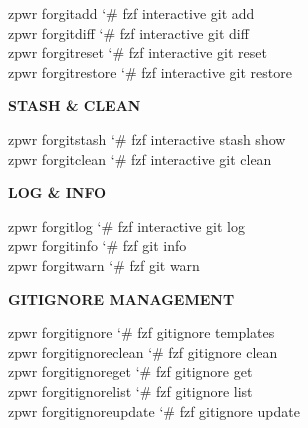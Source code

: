 \documentclass[11pt,a4paper,twoside]{book}
\begin{document}
\begin{codebox}
\color{neongreen}zpwr forgitadd             {\char`\#} fzf interactive git add\\
\color{neongreen}zpwr forgitdiff            {\char`\#} fzf interactive git diff\\
\color{neongreen}zpwr forgitreset           {\char`\#} fzf interactive git reset\\
\color{neongreen}zpwr forgitrestore         {\char`\#} fzf interactive git restore\\
\end{codebox}


\vspace{12pt}
{\bfseries\color{neonyellow} STASH \& CLEAN}\vspace{4pt}

\begin{codebox}
\color{neongreen}zpwr forgitstash           {\char`\#} fzf interactive stash show\\
\color{neongreen}zpwr forgitclean           {\char`\#} fzf interactive git clean\\
\end{codebox}


\vspace{12pt}
{\bfseries\color{neonyellow} LOG \& INFO}\vspace{4pt}

\begin{codebox}
\color{neongreen}zpwr forgitlog             {\char`\#} fzf interactive git log\\
\color{neongreen}zpwr forgitinfo            {\char`\#} fzf git info\\
\color{neongreen}zpwr forgitwarn            {\char`\#} fzf git warn\\
\end{codebox}


\vspace{12pt}
{\bfseries\color{neonyellow} GITIGNORE MANAGEMENT}\vspace{4pt}

\begin{codebox}
\color{neongreen}zpwr forgitignore          {\char`\#} fzf gitignore templates\\
\color{neongreen}zpwr forgitignoreclean     {\char`\#} fzf gitignore clean\\
\color{neongreen}zpwr forgitignoreget       {\char`\#} fzf gitignore get\\
\color{neongreen}zpwr forgitignorelist      {\char`\#} fzf gitignore list\\
\color{neongreen}zpwr forgitignoreupdate    {\char`\#} fzf gitignore update\\
\end{codebox}
\end{document}
